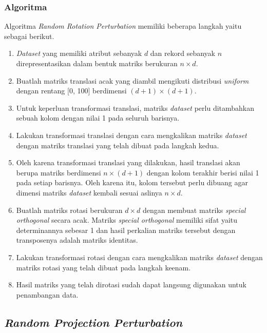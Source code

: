 \subsubsection{Algoritma}
\label{subsubsec:algo-rotation}

Algoritma \textit{Random Rotation Perturbation} memiliki beberapa langkah yaitu sebagai berikut.
\begin{enumerate}
    \item \textit{Dataset} yang memiliki atribut sebanyak \(d\) dan rekord sebanyak \(n\) direpresentasikan dalam bentuk matriks berukuran \(n \times d\).
    \item Buatlah matriks translasi acak yang diambil mengikuti distribusi \textit{uniform} dengan rentang [0, 100] berdimensi \((d+1)\times(d+1)\).
    \item Untuk keperluan transformasi translasi, matriks \textit{dataset} perlu ditambahkan sebuah kolom dengan nilai 1 pada seluruh barisnya.
    \item Lakukan transformasi translasi dengan cara mengkalikan matriks \textit{dataset} dengan matriks translasi yang telah dibuat pada langkah kedua.
    \item Oleh karena transformasi translasi yang dilakukan, hasil translasi akan berupa matriks berdimensi \(n\times(d+1)\) dengan kolom terakhir berisi nilai 1 pada setiap barisnya. Oleh karena itu, kolom tersebut perlu dibuang agar dimensi matriks \textit{dataset} kembali sesuai aslinya \(n \times d\).
    \item Buatlah matriks rotasi berukuran \(d \times d\) dengan membuat matriks \textit{special orthogonal} secara acak. Matriks \textit{special orthogonal} memiliki sifat yaitu determinannya sebesar 1 dan hasil perkalian matriks tersebut dengan transposenya adalah matriks identitas.
    \item Lakukan transformasi rotasi dengan cara mengkalikan matriks \textit{dataset} dengan matriks rotasi yang telah dibuat pada langkah keenam.
    \item Hasil matriks yang telah dirotasi sudah dapat langsung digunakan untuk penambangan data.
\end{enumerate}

\subsection{\textit{Random Projection Perturbation}}
\label{subsec:rpp}

